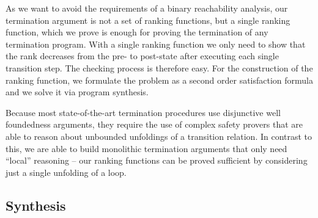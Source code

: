 \documentclass[preprint]{sigplanconf}
\theoremstyle{definition}
\begin{document}
As we want to avoid the requirements of a binary reachability analysis, our termination argument is not a set
of ranking functions, but a single ranking function, which we prove is enough for proving the termination of any termination program. 
With a single ranking function we only need to show that the rank decreases from the
pre- to post-state after executing each single transition step.
The checking process is therefore easy. For the construction of the ranking function, we 
formulate the problem as a second order satisfaction formula and we solve it via program synthesis.


Because most state-of-the-art termination procedures use disjunctive well foundedness arguments, they require the use of
complex safety provers that are able to reason about unbounded unfoldings of a transition relation.  In contrast to this,
we are able to build monolithic termination arguments that only need ``local'' reasoning -- our ranking functions
can be proved sufficient by considering just a single unfolding of a loop.






\subsection{Synthesis}


\end{document}
